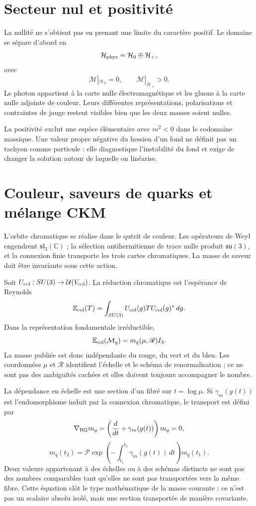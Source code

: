 \section{Secteur nul et positivité}

La nullité ne s'obtient pas en prenant une limite du caractère positif. Le domaine
se sépare d'abord en
\[
 \mathcal H_{\rm phys}=\mathcal H_0\oplus\mathcal H_+,
\]
avec
\[
 \mathcal M|_{\mathcal H_0}=0,
 \qquad
 \mathcal M|_{\mathcal H_+}>0.
\]
Le photon appartient à la carte nulle électromagnétique et les gluons à la carte
nulle adjointe de couleur. Leurs différentes représentations, polarisations et
contraintes de jauge restent visibles bien que les deux masses soient nulles.

La positivité exclut une espèce élémentaire avec \(m^2<0\) dans le
codomaine massique. Une valeur propre négative du hessien d'un fond ne définit pas un
tachyon comme particule : elle diagnostique l'instabilité du fond et exige de changer
la solution autour de laquelle on linéarise.

\section{Couleur, saveurs de quarks et mélange CKM}

L'orbite chromatique se réalise dans le qutrit de couleur. Les opérateurs de Weyl
engendrent \(\mathfrak{sl}_3(\mathbb C)\) ; la sélection antihermitienne de trace
nulle produit \(\mathfrak{su}(3)\), et la connexion finie transporte les trois
cartes chromatiques. La masse de saveur doit être invariante sous cette action.

Soit \(U_{\rm col}:SU(3)\to\mathcal U(V_{\rm col})\). La réduction chromatique
est l'espérance de Reynolds
\[
 \mathbb E_{\rm col}(T)
 =\int_{SU(3)}U_{\rm col}(g)T U_{\rm col}(g)^*\,dg.
\]
Dans la représentation fondamentale irréductible,
\[
 \mathbb E_{\rm col}(\mathcal M_q)
 =m_q(\mu,\mathscr R)I_3.
\]
La masse publiée est donc indépendante du rouge, du vert et du bleu. Les
coordonnées \(\mu\) et \(\mathscr R\) identifient l'échelle et le schéma de
renormalisation ; ce ne sont pas des ambiguïtés cachées et elles doivent toujours accompagner le
nombre.

La dépendance en échelle est une section d'un fibré sur
\(t=\log\mu\). Si \(\gamma_m(g(t))\) est l'endomorphisme induit par la
connexion chromatique, le transport est défini par
\[
 \nabla_{\rm RG}m_q
 =\left(\frac{d}{dt}+\gamma_m(g(t))\right)m_q=0,
\]
\[
 m_q(t_2)
 =\mathcal P\exp\!\left(-\int_{t_1}^{t_2}
 \gamma_m(g(t))\,dt\right)m_q(t_1).
\]
Deux valeurs appartenant à des échelles ou à des schémas distincts ne sont pas des nombres
comparables tant qu'elles ne sont pas transportées vers la même fibre. Cette équation clôt le
type mathématique de la masse courante : ce n'est pas un scalaire absolu isolé, mais
une section transportée de manière covariante.

